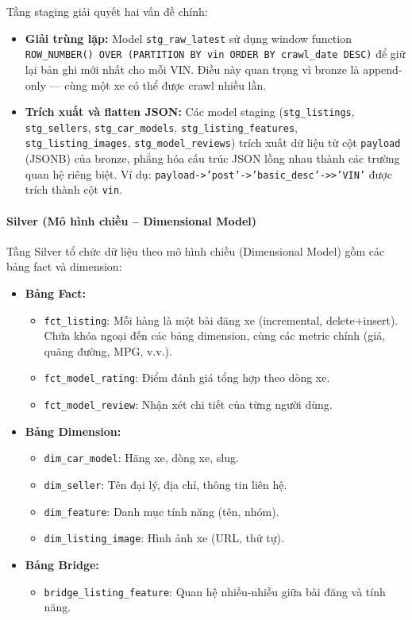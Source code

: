 Tầng staging giải quyết hai vấn đề chính:
\begin{itemize}
    \item \textbf{Giải trùng lặp:} Model \texttt{stg\_raw\_latest} sử dụng window function \texttt{ROW\_NUMBER() OVER (PARTITION BY vin ORDER BY crawl\_date DESC)} để giữ lại bản ghi mới nhất cho mỗi VIN. Điều này quan trọng vì bronze là append-only — cùng một xe có thể được crawl nhiều lần.
    \item \textbf{Trích xuất và flatten JSON:} Các model staging (\texttt{stg\_listings}, \texttt{stg\_sellers}, \texttt{stg\_car\_models}, \texttt{stg\_listing\_features}, \texttt{stg\_listing\_images}, \texttt{stg\_model\_reviews}) trích xuất dữ liệu từ cột \texttt{payload} (JSONB) của bronze, phẳng hóa cấu trúc JSON lồng nhau thành các trường quan hệ riêng biệt. Ví dụ: \texttt{payload->'post'->'basic\_desc'->>'VIN'} được trích thành cột \texttt{vin}.
\end{itemize}

\paragraph{Silver (Mô hình chiều -- Dimensional Model)}

Tầng Silver tổ chức dữ liệu theo mô hình chiều (Dimensional Model) gồm các bảng fact và dimension:

\begin{itemize}
    \item \textbf{Bảng Fact:}
    \begin{itemize}
        \item \texttt{fct\_listing}: Mỗi hàng là một bài đăng xe (incremental, delete+insert). Chứa khóa ngoại đến các bảng dimension, cùng các metric chính (giá, quãng đường, MPG, v.v.).
        \item \texttt{fct\_model\_rating}: Điểm đánh giá tổng hợp theo dòng xe.
        \item \texttt{fct\_model\_review}: Nhận xét chi tiết của từng người dùng.
    \end{itemize}
    \item \textbf{Bảng Dimension:}
    \begin{itemize}
        \item \texttt{dim\_car\_model}: Hãng xe, dòng xe, slug.
        \item \texttt{dim\_seller}: Tên đại lý, địa chỉ, thông tin liên hệ.
        \item \texttt{dim\_feature}: Danh mục tính năng (tên, nhóm).
        \item \texttt{dim\_listing\_image}: Hình ảnh xe (URL, thứ tự).
    \end{itemize}
    \item \textbf{Bảng Bridge:}
    \begin{itemize}
        \item \texttt{bridge\_listing\_feature}: Quan hệ nhiều-nhiều giữa bài đăng và tính năng.
    \end{itemize}
\end{itemize}

